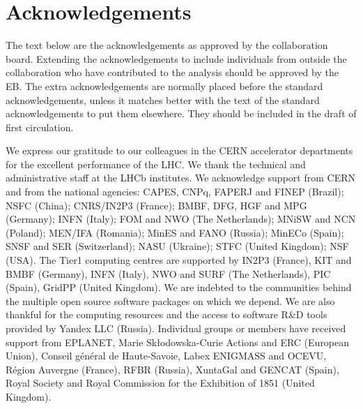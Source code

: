 \section*{Acknowledgements}

The text below are the acknowledgements as approved by the collaboration
board. Extending the acknowledgements to include individuals from outside the
collaboration who have contributed to the analysis should be approved by the
EB. The extra acknowledgements are normally placed before the standard 
acknowledgements, unless it matches better with the text of the standard 
acknowledgements to put them elsewhere.
They should be included in the draft of first circulation.
 
\noindent We express our gratitude to our colleagues in the CERN
accelerator departments for the excellent performance of the LHC. We
thank the technical and administrative staff at the LHCb
institutes. We acknowledge support from CERN and from the national
agencies: CAPES, CNPq, FAPERJ and FINEP (Brazil); NSFC (China);
CNRS/IN2P3 (France); BMBF, DFG, HGF and MPG (Germany); INFN (Italy); 
FOM and NWO (The Netherlands); MNiSW and NCN (Poland); MEN/IFA (Romania); 
MinES and FANO (Russia); MinECo (Spain); SNSF and SER (Switzerland); 
NASU (Ukraine); STFC (United Kingdom); NSF (USA).
The Tier1 computing centres are supported by IN2P3 (France), KIT and BMBF 
(Germany), INFN (Italy), NWO and SURF (The Netherlands), PIC (Spain), GridPP 
(United Kingdom).
We are indebted to the communities behind the multiple open 
source software packages on which we depend. We are also thankful for the 
computing resources and the access to software R\&D tools provided by Yandex LLC (Russia).
Individual groups or members have received support from 
EPLANET, Marie Sk\l{}odowska-Curie Actions and ERC (European Union), 
Conseil g\'{e}n\'{e}ral de Haute-Savoie, Labex ENIGMASS and OCEVU, 
R\'{e}gion Auvergne (France), RFBR (Russia), XuntaGal and GENCAT (Spain), Royal Society and Royal
Commission for the Exhibition of 1851 (United Kingdom).

